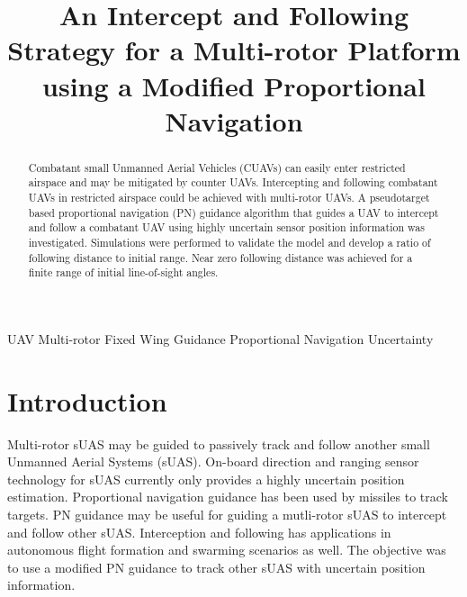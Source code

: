 \documentclass[conference]{IEEEtran}
\begin{document}
\title{An Intercept and Following Strategy for a Multi-rotor Platform using a Modified Proportional Navigation}

\author{
\and
{}
}

\maketitle


\begin{abstract}
	Combatant small Unmanned Aerial Vehicles (CUAVs) can easily enter restricted airspace and may be mitigated by counter UAVs. Intercepting and following combatant UAVs in restricted airspace could be achieved with multi-rotor UAVs. A pseudotarget based proportional navigation (PN) guidance algorithm that guides a UAV to intercept and follow a combatant UAV using highly uncertain sensor position information was investigated. Simulations were performed to validate the model and develop a ratio of following distance to initial range. Near zero following distance was achieved for a finite range of initial line-of-sight angles.
\end{abstract}

\begin{IEEEkeywords}
	UAV
	Multi-rotor
	Fixed Wing
	Guidance
	Proportional Navigation
	Uncertainty

\end{IEEEkeywords}

\section{Introduction}


Multi-rotor sUAS may be guided to passively track and follow another small Unmanned Aerial Systems (sUAS). On-board direction and ranging sensor technology for sUAS currently only provides a highly uncertain position estimation. Proportional navigation guidance has been used by missiles to track targets. PN guidance may be useful for guiding a mutli-rotor sUAS to intercept and follow other sUAS. Interception and following has applications in autonomous flight formation and swarming scenarios as well. The objective was to use a modified PN guidance to track other sUAS with uncertain position information.
\end{document}
